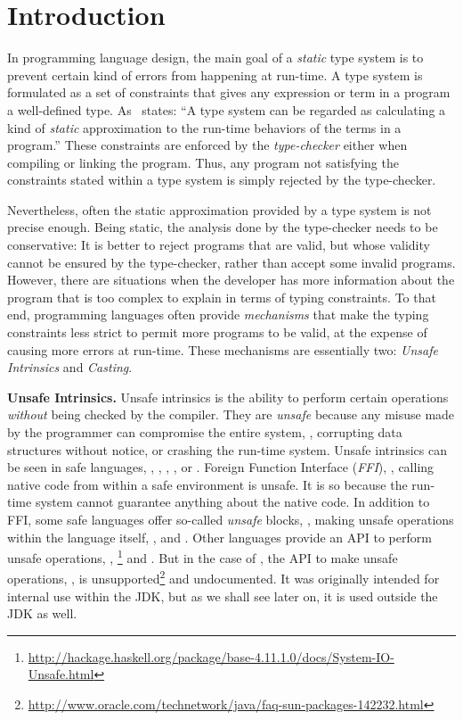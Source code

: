 \chapter{Introduction}

In programming language design, the main goal of a \emph{static} type system is to prevent certain kind of errors from happening at run-time.
A type system is formulated as a set of constraints that gives any expression or term in a program a well-defined type.
As~\cite{pierceTypesProgrammingLanguages2002} states:
``A type system can be regarded as calculating a kind of \emph{static} approximation to the run-time behaviors of the terms in a program.''
These constraints are enforced by the \emph{type-checker} either when compiling or linking the program.
Thus, any program not satisfying the constraints stated within a type system is simply rejected by the type-checker.

Nevertheless, often the static approximation provided by a type system is not precise enough.
Being static, the analysis done by the type-checker needs to be conservative:
It is better to reject programs that are valid,
but whose validity cannot be ensured by the type-checker,
rather than accept some invalid programs.
However, there are situations when the developer has more information
about the program that is too complex to explain in terms of typing constraints.
To that end, programming languages often provide \emph{mechanisms} that 
make the typing constraints less strict
to permit more programs to be valid,
at the expense of causing more errors at run-time.
These mechanisms are essentially two:
\emph{Unsafe Intrinsics} and \emph{Casting}.

\textbf{Unsafe Intrinsics.}
Unsafe intrinsics is the ability to perform certain operations \emph{without} being checked by the compiler.
They are \emph{unsafe} because any misuse made by the programmer can compromise the entire system, \eg{},
corrupting data structures without notice, or
crashing the run-time system.
Unsafe intrinsics can be seen in safe languages, \eg{},
,
,
, or
.
Foreign Function Interface (\emph{FFI}), \ie{}, calling native code from within a safe environment is unsafe.
It is so because the run-time system cannot guarantee anything about the native code.
In addition to FFI, some safe languages offer so-called \emph{unsafe} blocks, \ie{}, making unsafe operations within the language itself, \eg{},
%
and
.%
Other languages provide an API to perform unsafe operations, \eg{},
\footnote{\url{http://hackage.haskell.org/package/base-4.11.1.0/docs/System-IO-Unsafe.html}}
and
.
But in the case of , the API to make unsafe operations,
,
is unsupported\footnote{\url{http://www.oracle.com/technetwork/java/faq-sun-packages-142232.html}}
and undocumented.
It was originally intended for internal use within the JDK, but as we shall see later on, it is used outside the JDK as well.

